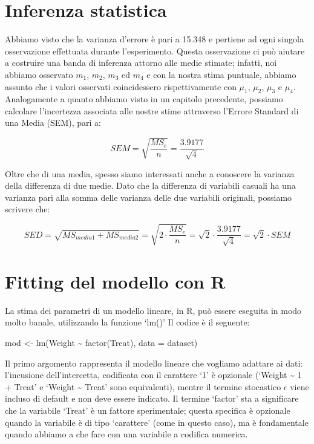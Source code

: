 \documentclass[a4paper,12pt,oneside]{book}
\newenvironment{Shaded}{\begin{snugshade}}{\end{snugshade}}
\newcommand{\SpecialCharTok}[1]{#1}
\newcommand{\OtherTok}[1]{#1}
\newcommand{\FunctionTok}[1]{#1}
\newcommand{\AttributeTok}[1]{#1}
\newcommand{\NormalTok}[1]{#1}
\begin{document}
\hypertarget{inferenza-statistica}{%
\section{Inferenza statistica}\label{inferenza-statistica}}

Abbiamo visto che la varianza d'errore è pari a 15.348 e pertiene ad ogni singola osservazione effettuata durante l'esperimento. Questa osservazione ci può aiutare a costruire una banda di inferenza attorno alle medie stimate; infatti, noi abbiamo osservato \(m_1\), \(m_2\), \(m_3\) ed \(m_4\) e con la nostra stima puntuale, abbiamo assunto che i valori osservati coincidessero rispettivamente con \(\mu_1\), \(\mu_2\), \(\mu_3\) e \(\mu_4\). Analogamente a quanto abbiamo visto in un capitolo precedente, possiamo calcolare l'incertezza associata alle nostre stime attraverso l'Errore Standard di una Media (SEM), pari a:

\[SEM = \sqrt{ \frac{MS_e}{n} } =  \frac{3.9177}{\sqrt{4}}\]

Oltre che di una media, spesso siamo interessati anche a conoscere la varianza della differenza di due medie. Dato che la differenza di variabili casuali ha una varianza pari alla somma delle varianza delle due variabili originali, possiamo scrivere che:

\[SED = \sqrt{ MS_{media1} + MS_{media2} } = \sqrt{ 2 \cdot \frac{MS_e}{n} } =  \sqrt{2}  \cdot \frac{3.9177}{\sqrt{4}} = \sqrt{2} \cdot SEM\]

\hypertarget{fitting-del-modello-con-r}{%
\section{Fitting del modello con R}\label{fitting-del-modello-con-r}}

La stima dei parametri di un modello lineare, in R, può essere eseguita in modo molto banale, utilizzando la funzione `lm()' Il codice è il seguente:

\begin{Shaded}
\begin{Highlighting}[]
\NormalTok{mod }\OtherTok{\textless{}{-}} \FunctionTok{lm}\NormalTok{(Weight }\SpecialCharTok{\textasciitilde{}} \FunctionTok{factor}\NormalTok{(Treat), }\AttributeTok{data =}\NormalTok{ dataset)}
\end{Highlighting}
\end{Shaded}

Il primo argomento rappresenta il modello lineare che vogliamo adattare ai dati: l'incusione dell'intercetta, codificata con il carattere `1' è opzionale (`Weight \textasciitilde{} 1 + Treat' e `Weight \textasciitilde{} Treat' sono equivalenti), mentre il termine stocastico \(\epsilon\) viene incluso di default e non deve essere indicato. Il termine `factor' sta a significare che la variabile `Treat' è un fattore sperimentale; questa specifica è opzionale quando la variabile è di tipo `carattere' (come in questo caso), ma è fondamentale quando abbiamo a che fare con una variabile a codifica numerica.
\end{document}
